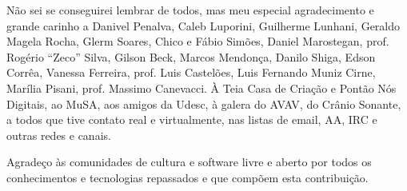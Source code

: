\vspace{4 mm}

Não sei se conseguirei lembrar de todos, mas meu especial agradecimento e grande
carinho a Danivel Penalva, Caleb Luporini, Guilherme Lunhani, Geraldo Magela
Rocha, Glerm Soares, Chico e Fábio Simões, Daniel Marostegan, prof. Rogério
``Zeco'' Silva, Gilson Beck, Marcos Mendonça, Danilo Shiga, Edson Corrêa,
Vanessa Ferreira, prof. Luis Castelões, Luis Fernando Muniz Cirne, Marília
Pisani, prof. Massimo Canevacci. À Teia Casa de Criação e Pontão Nós Digitais,
ao MuSA, aos amigos da Udesc, à galera do AVAV, do Crânio Sonante, a todos que
tive contato real e virtualmente, nas listas de email, AA, IRC e outras redes e
canais.

\vspace{4 mm}

Agradeço às comunidades de cultura e software livre e aberto por todos os
conhecimentos e tecnologias repassados e que compõem esta contribuição.

\vspace{4 mm}

\begin{center}
\end{center}
